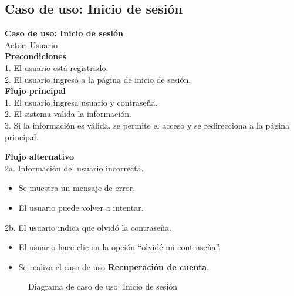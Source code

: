 \documentclass[12pt,a4paper]{article}
\begin{document}
\subsection{Caso de uso: Inicio de sesión}

\begin{tcolorbox}[colback=white, colframe=black, rounded corners]
  {\Large \textbf{Caso de uso: Inicio de sesión}} \\
  {\large Actor: Usuario} \vspace*{0.5cm} \\
  {{\large \textbf{Precondiciones}} \\
  1. El usuario está registrado. \\
  2. El usuario ingresó a la página de inicio de sesión.
  } \vspace*{0.5cm} \\
  {{\large \textbf{Flujo principal}} \\
  1. El usuario ingresa usuario y contraseña. \\
  2. El sistema valida la información. \\
  3. Si la información es válida, se permite el acceso y se redirecciona a la página principal.
  } \vspace*{.5cm} \\
  {{\large \textbf{Flujo alternativo}} \\
  2a. Información del usuario incorrecta.
  \begin{itemize}
    \item Se muestra un mensaje de error.
    \item El usuario puede volver a intentar.
  \end{itemize}
  2b. El usuario indica que olvidó la contraseña.
  \begin{itemize}
    \item El usuario hace clic en la opción ``olvidé mi contraseña''.
    \item Se realiza el caso de uso \textbf{Recuperación de cuenta}.
  \end{itemize}
  }
\end{tcolorbox}

\begin{figure}[H]
  \centering
  \caption{Diagrama de caso de uso: Inicio de sesión}
  \label{fig:diagusoLogin}
\end{figure}
\end{document}
